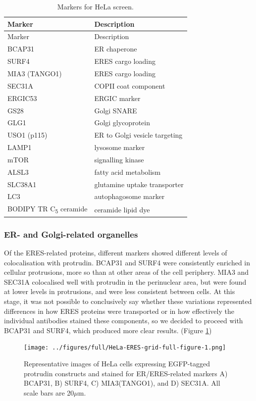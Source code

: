 \documentclass[
  12pt,
  a4paper,
]{book}
\begin{document}
\begin{longtable}[]{@{}ll@{}}
\caption{\label{tab:unnamed-chunk-1}Markers for HeLa screen.}\tabularnewline
\toprule()
Marker & Description \\
\midrule()
\endfirsthead
\toprule()
Marker & Description \\
\midrule()
\endhead
BCAP31 & ER chaperone \\
SURF4 & ERES cargo loading \\
MIA3 (TANGO1) & ERES cargo loading \\
SEC31A & COPII coat component \\
ERGIC53 & ERGIC marker \\
GS28 & Golgi SNARE \\
GLG1 & Golgi glycoprotein \\
USO1 (p115) & ER to Golgi vesicle targeting \\
LAMP1 & lysosome marker \\
mTOR & signalling kinase \\
ALSL3 & fatty acid metabolism \\
SLC38A1 & glutamine uptake transporter \\
LC3 & autophagosome marker \\
BODIPY TR C\textsubscript{5} ceramide & ceramide lipid dye \\
\bottomrule()
\end{longtable}

\hypertarget{er--and-golgi-related-organelles}{%
\subsubsection{ER- and Golgi-related organelles}\label{er--and-golgi-related-organelles}}

Of the ERES-related proteins, different markers showed different levels of colocalisation with protrudin. BCAP31 and SURF4 were consistently enriched in cellular protrusions, more so than at other areas of the cell periphery. MIA3 and SEC31A colocalised well with protrudin in the perinuclear area, but were found at lower levels in protrusions, and were less consistent between cells. At this stage, it was not possible to conclusively say whether these variations represented differences in how ERES proteins were transported or in how effectively the individual antibodies stained these components, so we decided to proceed with BCAP31 and SURF4, which produced more clear results. (Figure \ref{fig:HeLa-ERES-grid-full-figure})

\begin{figure}
\centering
\texttt{[image: ../figures/full/HeLa-ERES-grid-full-figure-1.png]}
\caption{\label{fig:HeLa-ERES-grid-full-figure}Representative images of HeLa cells expressing EGFP-tagged protrudin constructs and stained for ER/ERES-related markers A) BCAP31, B) SURF4, C) MIA3(TANGO1), and D) SEC31A. All scale bars are 20\(\mu\)m.}
\end{figure}
\end{document}
